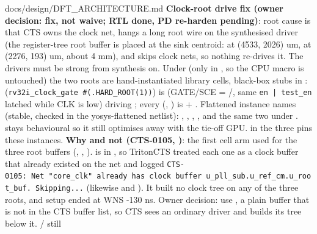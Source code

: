 \begin{relocated}{docs/design/DFT_ARCHITECTURE.md}
\textbf{Clock-root drive fix (owner decision: fix, not waive; RTL done,
PD re-harden pending)}: root cause is that CTS owns the clock net, hangs
a long root wire on the synthesised driver (the register-tree root
buffer is placed at the sink centroid:  at (4533, 2026) um,
 at (2276, 193) um, about 4 mm), and
 skips clock nets, so nothing re-drives it. The
drivers must be strong from synthesis on. Under
 (only in
, so the CPU macro is untouched) the two
roots are hand-instantiated library cells, black-box stubs in
: 
(\texttt{rv32i\_\allowbreak{}clock\_\allowbreak{}gate\ \#(.\allowbreak{}HARD\_\allowbreak{}ROOT(1))})
is  (GATE/SCE =
/, same \texttt{en\ |\ test\_\allowbreak{}en}
latched while CLK is low) driving ; every
 (,
) is  + .
Flattened instance names (stable, checked in the yosys-flattened
netlist): ,
, ,
, and the same two under
.  stays behavioural so it still
optimises away with the tie-off GPU.  in the
three  pins these instances.
\textbf{Why  and not  (CTS-0105,
)}: the first cell
arm used  for the three root buffers
(,
,
).  is in
, so TritonCTS treated each one as a clock buffer
that already existed on the net and logged
\texttt{CTS-\allowbreak{}0105:\allowbreak{}\ Net\ "core\_\allowbreak{}clk"\ already\ has\ clock\ buffer\ u\_\allowbreak{}pll\_\allowbreak{}sub.\allowbreak{}u\_\allowbreak{}ref\_\allowbreak{}cm.\allowbreak{}u\_\allowbreak{}root\_\allowbreak{}buf.\allowbreak{}\ Skipping.\allowbreak{}.\allowbreak{}.\allowbreak{}}
(likewise  and ). It built no
clock tree on any of the three roots, and setup ended at WNS -130 ns.
Owner decision: use , a plain buffer that
is not in the CTS buffer list, so CTS sees an ordinary driver and builds
its tree below it.  /  still

\end{relocated}
